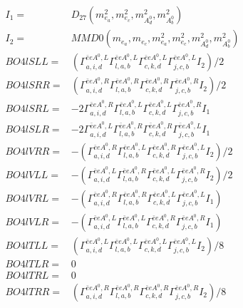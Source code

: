 \documentclass[A4,landscape]{article}
\begin{document}
\begin{align} 
I_1 = & D_{27}(m^2_{e_{{a}}}, m^2_{e_{{c}}}, m^2_{A^0_{{d}}}, m^2_{A^0_{{b}}}) \\ 
I_2 = & MMD0(m_{e_{{a}}}, m_{e_{{c}}}, m^2_{e_{{a}}}, m^2_{e_{{c}}}, m^2_{A^0_{{d}}}, m^2_{A^0_{{b}}}) \\ 
  BO4lSLL= & ( \Gamma^{\bar{e}e A^0 ,L}_{a, i, d} \Gamma^{\bar{e}e A^0 ,L}_{l, a, b} \Gamma^{\bar{e}e A^0 ,L}_{c, k, d} \Gamma^{\bar{e}e A^0 ,L}_{j, c, b} I_2)/2 \\ 
  BO4lSRR= & ( \Gamma^{\bar{e}e A^0 ,R}_{a, i, d} \Gamma^{\bar{e}e A^0 ,R}_{l, a, b} \Gamma^{\bar{e}e A^0 ,R}_{c, k, d} \Gamma^{\bar{e}e A^0 ,R}_{j, c, b} I_2)/2 \\ 
  BO4lSRL= & -2  \Gamma^{\bar{e}e A^0 ,R}_{a, i, d} \Gamma^{\bar{e}e A^0 ,L}_{l, a, b} \Gamma^{\bar{e}e A^0 ,L}_{c, k, d} \Gamma^{\bar{e}e A^0 ,R}_{j, c, b} I_1 \\ 
  BO4lSLR= & -2  \Gamma^{\bar{e}e A^0 ,L}_{a, i, d} \Gamma^{\bar{e}e A^0 ,R}_{l, a, b} \Gamma^{\bar{e}e A^0 ,R}_{c, k, d} \Gamma^{\bar{e}e A^0 ,L}_{j, c, b} I_1 \\ 
  BO4lVRR= & -( \Gamma^{\bar{e}e A^0 ,R}_{a, i, d} \Gamma^{\bar{e}e A^0 ,L}_{l, a, b} \Gamma^{\bar{e}e A^0 ,R}_{c, k, d} \Gamma^{\bar{e}e A^0 ,L}_{j, c, b} I_2)/2 \\ 
  BO4lVLL= & -( \Gamma^{\bar{e}e A^0 ,L}_{a, i, d} \Gamma^{\bar{e}e A^0 ,R}_{l, a, b} \Gamma^{\bar{e}e A^0 ,L}_{c, k, d} \Gamma^{\bar{e}e A^0 ,R}_{j, c, b} I_2)/2 \\ 
  BO4lVRL= & -( \Gamma^{\bar{e}e A^0 ,R}_{a, i, d} \Gamma^{\bar{e}e A^0 ,R}_{l, a, b} \Gamma^{\bar{e}e A^0 ,L}_{c, k, d} \Gamma^{\bar{e}e A^0 ,L}_{j, c, b} I_1) \\ 
  BO4lVLR= & -( \Gamma^{\bar{e}e A^0 ,L}_{a, i, d} \Gamma^{\bar{e}e A^0 ,L}_{l, a, b} \Gamma^{\bar{e}e A^0 ,R}_{c, k, d} \Gamma^{\bar{e}e A^0 ,R}_{j, c, b} I_1) \\ 
  BO4lTLL= & ( \Gamma^{\bar{e}e A^0 ,L}_{a, i, d} \Gamma^{\bar{e}e A^0 ,L}_{l, a, b} \Gamma^{\bar{e}e A^0 ,L}_{c, k, d} \Gamma^{\bar{e}e A^0 ,L}_{j, c, b} I_2)/8 \\ 
  BO4lTLR= & 0 \\ 
  BO4lTRL= & 0 \\ 
  BO4lTRR= & ( \Gamma^{\bar{e}e A^0 ,R}_{a, i, d} \Gamma^{\bar{e}e A^0 ,R}_{l, a, b} \Gamma^{\bar{e}e A^0 ,R}_{c, k, d} \Gamma^{\bar{e}e A^0 ,R}_{j, c, b} I_2)/8 \\ 
\end{align} 
\end{document}
